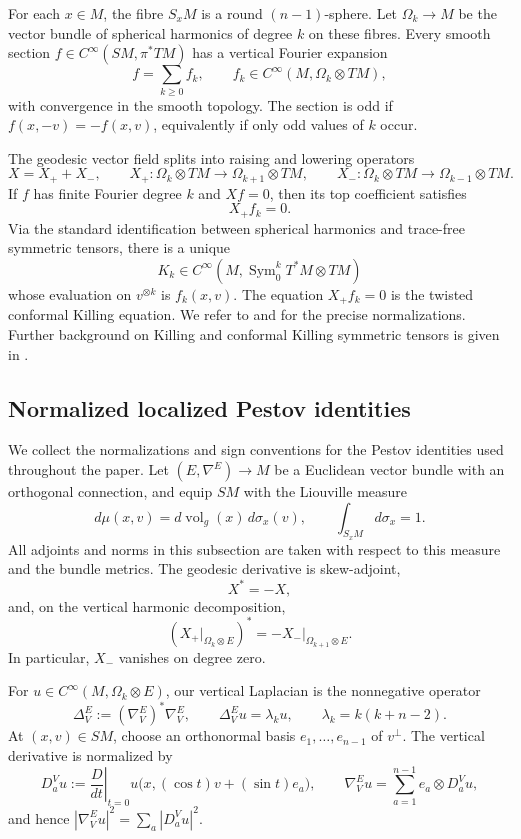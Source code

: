 \documentclass[reqno,11pt]{amsart}
\theoremstyle{definition}
\newcommand{\SM}{SM}
\newcommand{\Sym}{\operatorname{Sym}}
\newcommand{\vol}{\operatorname{vol}}
\begin{document}
For each $x\in M$, the fibre $S_xM$ is a round $(n-1)$-sphere. Let
$\Omega_k\to M$ be the vector bundle of spherical harmonics of degree $k$ on
these fibres. Every smooth section
$f\in C^\infty(\SM,\pi^*TM)$ has a vertical Fourier expansion
$$
  f=\sum_{k\geq0}f_k,
  \qquad
  f_k\in C^\infty(M,\Omega_k\otimes TM),
$$
with convergence in the smooth topology. The section is odd if
$f(x,-v)=-f(x,v)$, equivalently if only odd values of $k$ occur.

The geodesic vector field splits into raising and lowering operators
$$
  X=X_++X_- ,
  \qquad
  X_+:\Omega_k\otimes TM\longrightarrow\Omega_{k+1}\otimes TM,
  \qquad
  X_-:\Omega_k\otimes TM\longrightarrow\Omega_{k-1}\otimes TM.
$$
If $f$ has finite Fourier degree $k$ and $Xf=0$, then its top coefficient
satisfies
$$
  X_+f_k=0.
$$
Via the standard identification between spherical harmonics and trace-free
symmetric tensors, there is a unique
$$
  K_k\in C^\infty(M,\Sym^k_0T^*M\otimes TM)
$$
whose evaluation on $v^{\otimes k}$ is $f_k(x,v)$. The equation $X_+f_k=0$
is the twisted conformal Killing equation. We refer to
\cite[Sections~2.2 and 4.1]{CLMS24} and \cite{CLMSW25} for the precise
normalizations.  Further background on Killing and conformal Killing symmetric
tensors is given in
\cite{DairbekovSharafutdinov10,HeilMoroianuSemmelmann16}.

\subsection{Normalized localized Pestov identities}
\label{sec:normalized-pestov}

We collect the normalizations and sign conventions for the Pestov identities
used throughout the paper.  Let $(E,\nabla^E)\to M$ be a Euclidean vector
bundle with an orthogonal connection, and equip $\SM$ with the Liouville
measure
$$
  d\mu(x,v)=d\vol_g(x)\,d\sigma_x(v),
  \qquad \int_{S_xM}d\sigma_x=1.
$$
All adjoints and norms in this subsection are taken with respect to this
measure and the bundle metrics.  The geodesic derivative is skew-adjoint,
$$
  X^*=-X,
$$
and, on the vertical harmonic decomposition,
\begin{equation*}
  \left(X_+\big|_{\Omega_k\otimes E}\right)^*
  =-X_-\big|_{\Omega_{k+1}\otimes E}.
\end{equation*}
In particular, $X_-$ vanishes on degree zero.

For $u\in C^\infty(M,\Omega_k\otimes E)$, our vertical Laplacian is the
nonnegative operator
\begin{equation*}
  \Delta_V^E:=(\nabla_V^E)^*\nabla_V^E,
  \qquad
  \Delta_V^E u=\lambda_k u,
  \qquad
  \lambda_k=k(k+n-2).
\end{equation*}
At $(x,v)\in\SM$, choose an orthonormal basis
$e_1,\ldots,e_{n-1}$ of $v^\perp$.  The vertical derivative is normalized by
\begin{equation*}
  D_a^Vu
  :=\left.\frac{D}{dt}\right|_{t=0}
  u\bigl(x,(\cos t)v+(\sin t)e_a\bigr),
  \qquad
  \nabla_V^Eu=\sum_{a=1}^{n-1}e_a\otimes D_a^Vu,
\end{equation*}
and hence
$|\nabla_V^Eu|^2=\sum_a|D_a^Vu|^2$.
\end{document}
